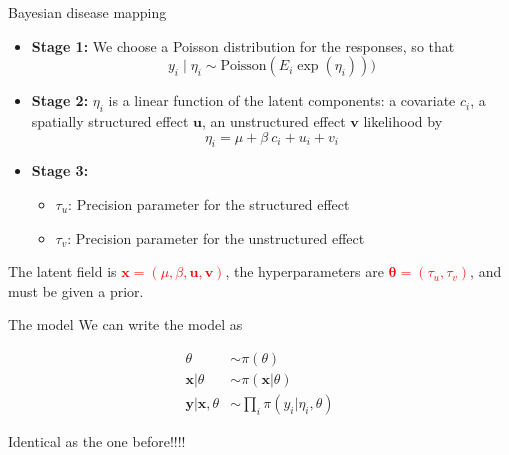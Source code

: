 \documentclass[
  ignorenonframetext,
]{beamer}
\providecommand{\tightlist}{%
  \setlength{\itemsep}{0pt}\setlength{\parskip}{0pt}}
\begin{document}
\begin{frame}{Bayesian disease mapping}
\protect\hypertarget{bayesian-disease-mapping}{}
\begin{itemize}[<+->]
\tightlist
\item
  \textbf{Stage 1:} We choose a Poisson distribution for the responses,
  so that \[
  y_i \mid \eta_i \sim \text{Poisson}(E_i\exp(\eta_i)))
  \]
\item
  \textbf{Stage 2:} \(\eta_i\) is a linear function of the latent
  components: a covariate \(c_i\), a spatially structured effect
  \(\mathbf{u}\), an unstructured effect \(\mathbf{v}\) likelihood by \[
  \eta_i = \mu+ \beta\ c_i + u_i + v_i
  \]
\item
  \textbf{Stage 3:}

  \begin{itemize}[<+->]
  \tightlist
  \item
    \(\tau_u\): Precision parameter for the structured effect
  \item
    \(\tau_v\): Precision parameter for the unstructured effect \pause\\
  \end{itemize}
\end{itemize}

The latent field is
\textcolor{red}{$\boldsymbol{x} = (\mu, \beta,\mathbf{u},\mathbf{v})$},
the hyperparameters are
\textcolor{red}{ $\boldsymbol{\theta} = (\tau_u,\tau_v)$}, and must be
given a prior.
\end{frame}

\begin{frame}{The model}
\protect\hypertarget{the-model-1}{}
We can write the model as

\[
\begin{aligned}
\theta & \sim \pi(\theta)\\
\mathbf{x}|\theta& \sim \pi(\mathbf{x}|\theta)\\
\mathbf{y}|\mathbf{x},\theta & \sim \prod_i\pi(y_i|\eta_i,\theta)
\end{aligned}
\]

Identical as the one before!!!!
\end{frame}
\end{document}
